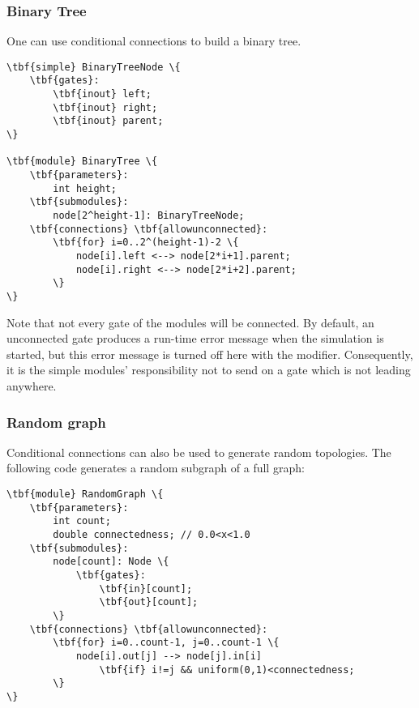 \subsubsection{Binary Tree}

One can use conditional connections to build a binary tree.

\begin{Verbatim}[commandchars=\\\{\}]
\tbf{simple} BinaryTreeNode \{
    \tbf{gates}:
        \tbf{inout} left;
        \tbf{inout} right;
        \tbf{inout} parent;
\}

\tbf{module} BinaryTree \{
    \tbf{parameters}:
        int height;
    \tbf{submodules}:
        node[2^height-1]: BinaryTreeNode;
    \tbf{connections} \tbf{allowunconnected}:
        \tbf{for} i=0..2^(height-1)-2 \{
            node[i].left <--> node[2*i+1].parent;
            node[i].right <--> node[2*i+2].parent;
        \}
\}
\end{Verbatim}

Note that not every gate of the modules will be connected. By default,
an unconnected gate produces a run-time error message when the
simulation is started, but this error message is turned off here with
the  modifier.
Consequently, it is the simple modules' responsibility not to send
on a gate which is not leading anywhere.



\subsubsection{Random graph}

Conditional connections can also be used to generate random
topologies.  The following code generates a
random subgraph of a full graph:

\begin{Verbatim}[commandchars=\\\{\}]
\tbf{module} RandomGraph \{
    \tbf{parameters}:
        int count;
        double connectedness; // 0.0<x<1.0
    \tbf{submodules}:
        node[count]: Node \{
            \tbf{gates}:
                \tbf{in}[count];
                \tbf{out}[count];
        \}
    \tbf{connections} \tbf{allowunconnected}:
        \tbf{for} i=0..count-1, j=0..count-1 \{
            node[i].out[j] --> node[j].in[i]
                \tbf{if} i!=j && uniform(0,1)<connectedness;
        \}
\}
\end{Verbatim}

